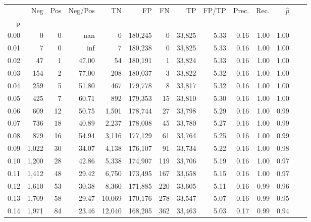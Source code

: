 \begin{tabular}{rrrrrrrrrrrrrr}
\toprule
{} &    Neg &  Pos & Neg/Pos &       TN &       FP &      FN &      TP & FP/TP & Prec. &  Rec. & $\hat{p}$ \\
p    &        &      &         &          &          &         &         &       &       &       &           \\
\midrule
0.00 &      0 &    0 &     nan &        0 &  180,245 &       0 &  33,825 &  5.33 &  0.16 &  1.00 &      1.00 \\
0.01 &      7 &    0 &     inf &        7 &  180,238 &       0 &  33,825 &  5.33 &  0.16 &  1.00 &      1.00 \\
0.02 &     47 &    1 &   47.00 &       54 &  180,191 &       1 &  33,824 &  5.33 &  0.16 &  1.00 &      1.00 \\
0.03 &    154 &    2 &   77.00 &      208 &  180,037 &       3 &  33,822 &  5.32 &  0.16 &  1.00 &      1.00 \\
0.04 &    259 &    5 &   51.80 &      467 &  179,778 &       8 &  33,817 &  5.32 &  0.16 &  1.00 &      1.00 \\
0.05 &    425 &    7 &   60.71 &      892 &  179,353 &      15 &  33,810 &  5.30 &  0.16 &  1.00 &      1.00 \\
0.06 &    609 &   12 &   50.75 &    1,501 &  178,744 &      27 &  33,798 &  5.29 &  0.16 &  1.00 &      0.99 \\
0.07 &    736 &   18 &   40.89 &    2,237 &  178,008 &      45 &  33,780 &  5.27 &  0.16 &  1.00 &      0.99 \\
0.08 &    879 &   16 &   54.94 &    3,116 &  177,129 &      61 &  33,764 &  5.25 &  0.16 &  1.00 &      0.99 \\
0.09 &  1,022 &   30 &   34.07 &    4,138 &  176,107 &      91 &  33,734 &  5.22 &  0.16 &  1.00 &      0.98 \\
0.10 &  1,200 &   28 &   42.86 &    5,338 &  174,907 &     119 &  33,706 &  5.19 &  0.16 &  1.00 &      0.97 \\
0.11 &  1,412 &   48 &   29.42 &    6,750 &  173,495 &     167 &  33,658 &  5.15 &  0.16 &  1.00 &      0.97 \\
0.12 &  1,610 &   53 &   30.38 &    8,360 &  171,885 &     220 &  33,605 &  5.11 &  0.16 &  0.99 &      0.96 \\
0.13 &  1,709 &   58 &   29.47 &   10,069 &  170,176 &     278 &  33,547 &  5.07 &  0.16 &  0.99 &      0.95 \\
0.14 &  1,971 &   84 &   23.46 &   12,040 &  168,205 &     362 &  33,463 &  5.03 &  0.17 &  0.99 &      0.94 \\

\end{tabular}
